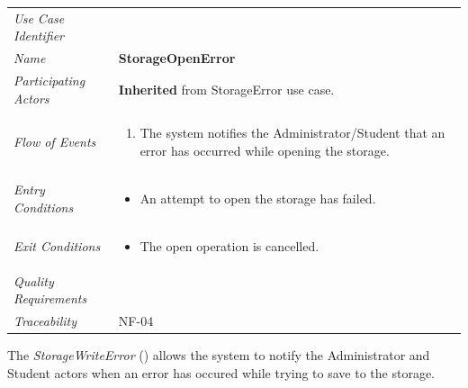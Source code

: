 \documentclass[12pt,letterpaper]{article}
\begin{document}
\begin{center}
	\begin{tabu} to 
		\toprule
		Use Case Identifier &  \\
		Name & {\bf StorageOpenError} \\
		Participating Actors & \textbf{Inherited} from StorageError use case. \\
		Flow of Events & 
		\begin{minipage}[t]{\linewidth}
		    \begin{enumerate}
			    \item The system notifies the Administrator/Student that an error has occurred while opening the storage.
			\end{enumerate}
		\end{minipage} \\

		Entry Conditions &
		\begin{minipage}[t]{\linewidth}
			\begin{itemize}
			    \item An attempt to open the storage has failed.
	        \end{itemize}
		\end{minipage} \\

		Exit Conditions &
		\begin{minipage}[t]{\linewidth}
			\begin{itemize}
			    \item The open operation is cancelled.
	        \end{itemize}
		\end{minipage} \\

		Quality Requirements & \\

		Traceability & NF-04 \\
		\toprule
	\end{tabu}
\end{center}

\newpage{}

The {\it StorageWriteError} () allows the system to notify the Administrator and Student actors when an error has occured while trying to save to the storage.
\end{document}
